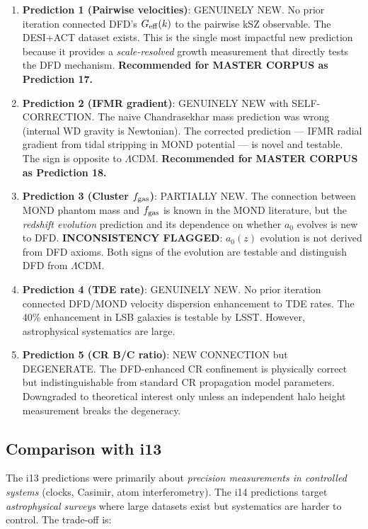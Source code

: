\documentclass[11pt]{article}
\newcommand{\LCDM}{$\Lambda$CDM}
\begin{document}
\begin{enumerate}
\item \textbf{Prediction 1 (Pairwise velocities)}: GENUINELY NEW. No prior
iteration connected DFD's $G_{\rm eff}(k)$ to the pairwise kSZ observable.
The DESI+ACT dataset exists. This is the single most impactful new prediction
because it provides a \emph{scale-resolved} growth measurement that directly
tests the DFD mechanism. \textbf{Recommended for MASTER CORPUS as Prediction 17.}

\item \textbf{Prediction 2 (IFMR gradient)}: GENUINELY NEW with SELF-CORRECTION.
The naive Chandrasekhar mass prediction was wrong (internal WD gravity is
Newtonian). The corrected prediction --- IFMR radial gradient from tidal
stripping in MOND potential --- is novel and testable. The sign is opposite
to \LCDM. \textbf{Recommended for MASTER CORPUS as Prediction 18.}

\item \textbf{Prediction 3 (Cluster $f_{\rm gas}$)}: PARTIALLY NEW. The
connection between MOND phantom mass and $f_{\rm gas}$ is known in the MOND
literature, but the \emph{redshift evolution} prediction and its dependence
on whether $a_0$ evolves is new to DFD. \textbf{INCONSISTENCY FLAGGED}:
$a_0(z)$ evolution is not derived from DFD axioms. Both signs of the evolution
are testable and distinguish DFD from \LCDM.

\item \textbf{Prediction 4 (TDE rate)}: GENUINELY NEW. No prior iteration
connected DFD/MOND velocity dispersion enhancement to TDE rates. The 40\%
enhancement in LSB galaxies is testable by LSST. However, astrophysical
systematics are large.

\item \textbf{Prediction 5 (CR B/C ratio)}: NEW CONNECTION but DEGENERATE.
The DFD-enhanced CR confinement is physically correct but indistinguishable
from standard CR propagation model parameters. Downgraded to theoretical
interest only unless an independent halo height measurement breaks the
degeneracy.
\end{enumerate}

\subsection{Comparison with i13}

The i13 predictions were primarily about \emph{precision measurements in
controlled systems} (clocks, Casimir, atom interferometry). The i14 predictions
target \emph{astrophysical surveys} where large datasets exist but
systematics are harder to control. The trade-off is:
\end{document}
